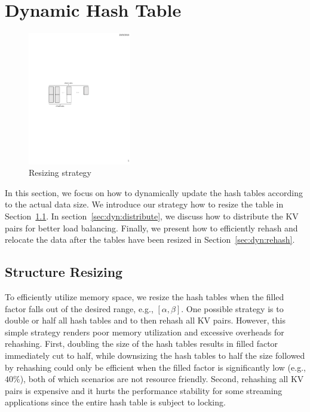 \section{Dynamic Hash Table}\label{sec:dyn}
\begin{figure}[t]
\centering
\includegraphics[width=0.4\textwidth]{fig/MultiTable.pdf}
\caption{Resizing strategy}
\label{fig:resize}
\end{figure}

In this section, we focus on how to dynamically update the hash tables according to the actual data size. 
We introduce our strategy how to resize the table in Section~\ref{sec:dyn:resize}.
In section~\ref{sec:dyn:distribute}, we discuss how to distribute the KV pairs for better load balancing. 
Finally, we present how to efficiently rehash and relocate the data after the tables have been resized in Section~\ref{sec:dyn:rehash}. 

\subsection{Structure Resizing}\label{sec:dyn:resize}
To efficiently utilize memory space, we resize the hash tables when the filled factor falls out of the desired range, e.g., $[\alpha,\beta]$.
One possible strategy is to double or half all hash tables and to then rehash all KV pairs. However, this simple strategy renders poor memory utilization and 
excessive overheads for rehashing. First, doubling the size of the hash tables results in filled factor immediately cut to half, while downsizing the hash tables to half the size followed by rehashing could only be efficient when the filled factor is significantly low (e.g., $40\%$), both of which scenarios are not resource friendly. Second, rehashing all KV pairs is expensive and it hurts the performance stability for some streaming applications since the entire hash table is subject to locking. 

